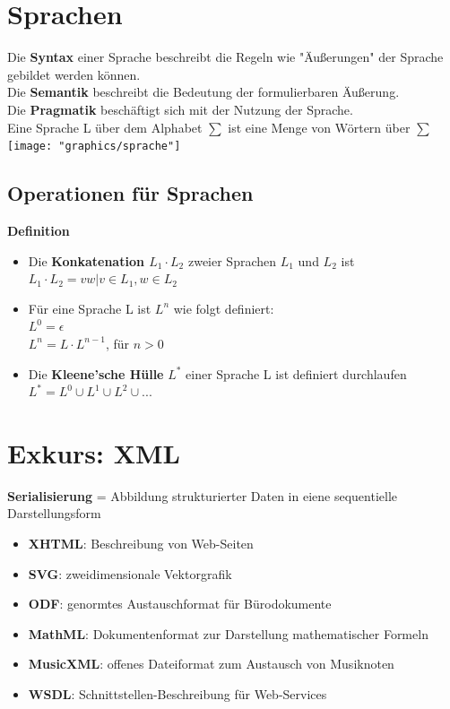 \documentclass{scrreprt}
\begin{document}
\section{Sprachen}
Die \textbf{Syntax} einer Sprache beschreibt die Regeln wie "Äußerungen" der Sprache gebildet werden können.
\\Die \textbf{Semantik} beschreibt die Bedeutung der formulierbaren Äußerung.
\\Die \textbf{Pragmatik} beschäftigt sich mit der Nutzung der Sprache.
\\Eine Sprache L über dem Alphabet $\sum$ ist eine Menge von Wörtern über $\sum$ \\
\texttt{[image: "graphics/sprache"]}
\subsection{Operationen für Sprachen}
\textbf{Definition}
\begin{itemize}
    \item Die \textbf{Konkatenation $L_{1} \cdot L_{2}$} zweier Sprachen $L_{1}$ und $L_{2}$ ist
    \\$L_{1} \cdot L_{2} = {vw | v \in L_{1}, w \in L_{2}}$
    \item Für eine Sprache L ist $L^{n}$ wie folgt definiert:
    \\$L^{0} = {\epsilon}$
    \\$L^{n} = L \cdot L^{n-1}$, für $n>0$
    \item Die \textbf{Kleene'sche Hülle} $L^{*}$ einer Sprache L ist definiert durchlaufen
    \\$L^{*} = L^{0} \cup L^{1} \cup L^{2} \cup ...$
\end{itemize}
\section{Exkurs: XML}
\textbf{Serialisierung} = Abbildung strukturierter Daten in eiene sequentielle Darstellungsform
\begin{itemize}
    \item \textbf{XHTML}: Beschreibung von Web-Seiten
    \item \textbf{SVG}: zweidimensionale Vektorgrafik
    \item \textbf{ODF}: genormtes Austauschformat für Bürodokumente
    \item \textbf{MathML}: Dokumentenformat zur Darstellung mathematischer Formeln
    \item \textbf{MusicXML}: offenes Dateiformat zum Austausch von Musiknoten
    \item \textbf{WSDL}: Schnittstellen-Beschreibung für Web-Services
\end{itemize}
\end{document}
